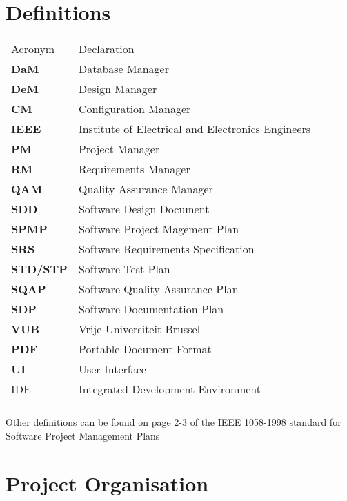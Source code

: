 \documentclass[9pt]{article}
\begin{document}
\section{Definitions}\label{definitions}

\begin{longtable}[c]{@{}ll@{}}
\hline\noalign{\medskip}
Acronym & Declaration
\\\noalign{\medskip}
\hline\noalign{\medskip}
\textbf{DaM} & Database Manager
\\\noalign{\medskip}
\textbf{DeM} & Design Manager
\\\noalign{\medskip}
\textbf{CM} & Configuration Manager
\\\noalign{\medskip}
\textbf{IEEE} & Institute of Electrical and Electronics Engineers
\\\noalign{\medskip}
\textbf{PM} & Project Manager
\\\noalign{\medskip}
\textbf{RM} & Requirements Manager
\\\noalign{\medskip}
\textbf{QAM} & Quality Assurance Manager
\\\noalign{\medskip}
\textbf{SDD} & Software Design Document
\\\noalign{\medskip}
\textbf{SPMP} & Software Project Magement Plan
\\\noalign{\medskip}
\textbf{SRS} & Software Requirements Specification
\\\noalign{\medskip}
\textbf{STD/STP} & Software Test Plan
\\\noalign{\medskip}
\textbf{SQAP} & Software Quality Assurance Plan
\\\noalign{\medskip}
\textbf{SDP} & Software Documentation Plan
\\\noalign{\medskip}
\textbf{VUB} & Vrije Universiteit Brussel
\\\noalign{\medskip}
\textbf{PDF} & Portable Document Format
\\\noalign{\medskip}
\textbf{UI} & User Interface
\\\noalign{\medskip}
IDE & Integrated Development Environment
\\\noalign{\medskip}
\hline
\end{longtable}

Other definitions can be found on page 2-3 of the IEEE 1058-1998
standard for Software Project Management Plans

\section{Project Organisation}\label{project-organisation}
\end{document}
